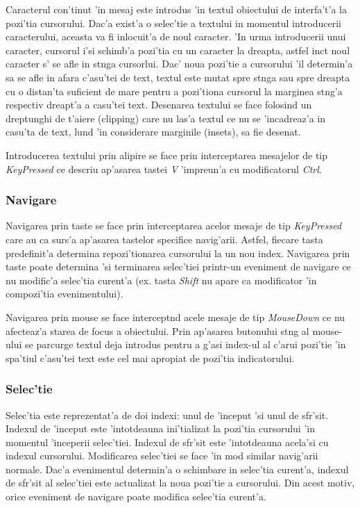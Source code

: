\medskip

Caracterul con'tinut 'in mesaj este introdus 'in textul obiectului de interfa't'a la pozi'tia cursorului. Dac'a exist'a o selec'tie a textului in momentul introducerii caracterului, aceasta va fi inlocuit'a de noul caracter. 'In urma introducerii unui caracter, cursorul i'si schimb'a pozi'tia cu un caracter la dreapta, astfel inc{\ia}t noul caracter s' se afle in st{\ia}nga cursorlui. Dac' noua pozi'tie a cursorului 'il determin'a sa se afle in afara c'asu'tei de text, textul este mutat spre st{\ia}nga sau spre dreapta cu o distan'ta suficient de mare pentru a pozi'tiona cursorul la marginea st{\ia}ng'a respectiv dreapt'a a casu'tei text. Desenarea textului se face folosind un dreptunghi de t'aiere (clipping) care nu las'a textul ce nu se 'incadreaz'a in casu'ta de text, lu{\ia}nd 'in considerare marginile (insets), sa fie desenat.

\medskip

Introducerea textului prin alipire se face prin interceptarea mesajelor de tip \emph{\emph{KeyPressed}} ce descriu ap'asarea tastei \emph{V} 'impreun'a cu modificatorul \emph{Ctrl}.

\subsubsection{Navigare}

Navigarea prin taste se face prin interceptarea acelor mesaje de tip \emph{\emph{KeyPressed}} care au ca surs'a ap'asarea tastelor specifice navig'arii. Astfel, fiecare tasta predefinit'a determina repozi'tionarea cursorului la un nou index. Navigarea prin taste poate determina 'si terminarea selec'tiei printr-un eveniment de navigare ce nu modific'a selec'tia curent'a (ex. tasta \emph{Shift} nu apare ca modificator 'in compozi'tia evenimentului).

\medskip

Navigarea prin mouse se face intercept{\ia}nd acele mesaje de tip \emph{MouseDown} ce nu afecteaz'a starea de focus a obiectului. Prin ap'asarea butonului st{\ia}ng al mouse-ului se parcurge textul deja introdus pentru a g'asi index-ul al c'arui pozi'tie 'in spa'tiul c'asu'tei text este cel mai apropiat de pozi'tia indicatorului.

\subsubsection{Selec'tie}

Selec'tia este reprezentat'a de doi indexi: unul de 'inceput 'si unul de sf{\ia}r'sit. Indexul de 'inceput este 'intotdeauna ini'tializat la pozi'tia cursorului 'in momentul 'inceperii selec'tiei. Indexul de sf{\ia}r'sit este 'intotdeauna acela'si cu indexul cursorului. Modificarea selec'tiei se face 'in mod similar navig'arii normale. Dac'a evenimentul determin'a o schimbare in selec'tia curent'a, indexul de sf{\ia}r'sit al selec'tiei este actualizat la noua pozi'tie a cursorului. Din acest motiv, orice eveniment de navigare poate modifica selec'tia curent'a.

